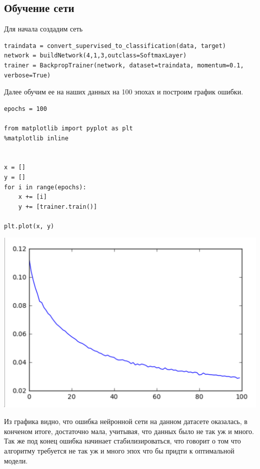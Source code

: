 \documentclass[12pt,reqno]{amsart}
\theoremstyle{definition}
\theoremstyle{remark}
\begin{document}
\subsection{Обучение сети}


Для начала создадим сеть

\begin{lstlisting}
traindata = convert_supervised_to_classification(data, target)
network = buildNetwork(4,1,3,outclass=SoftmaxLayer)
trainer = BackpropTrainer(network, dataset=traindata, momentum=0.1, verbose=True)
\end{lstlisting}

Далее обучим ее на наших данных на 100 эпохах и построим график ошибки.

\begin{lstlisting}
epochs = 100

from matplotlib import pyplot as plt
%matplotlib inline


x = []
y = []
for i in range(epochs):
    x += [i]
    y += [trainer.train()]

plt.plot(x, y)
\end{lstlisting}

\includegraphics[width=0.9 \textwidth]{1.png}

Из графика видно, что ошибка нейронной сети на данном датасете оказалась, в конченом итоге, достаточно мала, учитывая, что данных было не так уж и много. Так же под конец ошибка начинает стабилизироваться, что говорит о том что алгоритму требуется не так уж и много эпох что бы придти к оптимальной модели.
\end{document}
